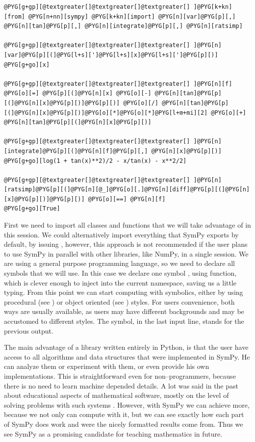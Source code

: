 \begin{Verbatim}[commandchars=@\[\]]
@PYG[g+gp][@textgreater[]@textgreater[]@textgreater[] ]@PYG[k+kn][from] @PYG[n+nn][sympy] @PYG[k+kn][import] @PYG[n][var]@PYG[p][,] @PYG[n][tan]@PYG[p][,] @PYG[n][integrate]@PYG[p][,] @PYG[n][ratsimp]

@PYG[g+gp][@textgreater[]@textgreater[]@textgreater[] ]@PYG[n][var]@PYG[p][(]@PYG[l+s][']@PYG[l+s][x]@PYG[l+s][']@PYG[p][)]
@PYG[g+go][x]

@PYG[g+gp][@textgreater[]@textgreater[]@textgreater[] ]@PYG[n][f] @PYG[o][=] @PYG[p][(]@PYG[n][x] @PYG[o][-] @PYG[n][tan]@PYG[p][(]@PYG[n][x]@PYG[p][)]@PYG[p][)] @PYG[o][/] @PYG[n][tan]@PYG[p][(]@PYG[n][x]@PYG[p][)]@PYG[o][*]@PYG[o][*]@PYG[l+m+mi][2] @PYG[o][+] @PYG[n][tan]@PYG[p][(]@PYG[n][x]@PYG[p][)]

@PYG[g+gp][@textgreater[]@textgreater[]@textgreater[] ]@PYG[n][integrate]@PYG[p][(]@PYG[n][f]@PYG[p][,] @PYG[n][x]@PYG[p][)]
@PYG[g+go][log(1 + tan(x)**2)/2 - x/tan(x) - x**2/2]

@PYG[g+gp][@textgreater[]@textgreater[]@textgreater[] ]@PYG[n][ratsimp]@PYG[p][(]@PYG[n][@_]@PYG[o][.]@PYG[n][diff]@PYG[p][(]@PYG[n][x]@PYG[p][)]@PYG[p][)] @PYG[o][==] @PYG[n][f]
@PYG[g+go][True]
\end{Verbatim}
\noindent
First we need to import all classes and functions that we will take advantage of in this
session. We could alternatively import everything that SymPy exports by default, by issuing
, however, this approach is not recommended if the user plans to use
SymPy in parallel with other libraries, like NumPy, in a single session. We are using a
general purpose programming language, so we need to declare all symbols that we will use.
In this case we declare one symbol , using  function, which is clever enough
to inject  into the current namespace, saving us a little typing. From this point we can
start computing with symbolics, either by using procedural (see ) or object
oriented (see ) styles. For users convenience, both ways are usually available,
as users may have different backgrounds and may be accustomed to different styles. The \code{\_}
symbol, in the last input line, stands for the previous output.

The main advantage of a library written entirely in Python, is that the user have access
to all algorithms and data structures that were implemented in SymPy. He can analyze them
or experiment with them, or even provide his own implementations. This is straightforward
even for non--programmers, because there is no need to learn machine depended details. A
lot was said in the past about educational aspects of mathematical software, mostly on the
level of solving problems with such systems \cite{Wang1976teaching}. However, with SymPy we
can achieve more, because we not only can compute with it, but we can see exactly how each
part of SymPy does work and were the nicely formatted results come from. Thus we see
SymPy as a promising candidate for teaching mathematics in future.

